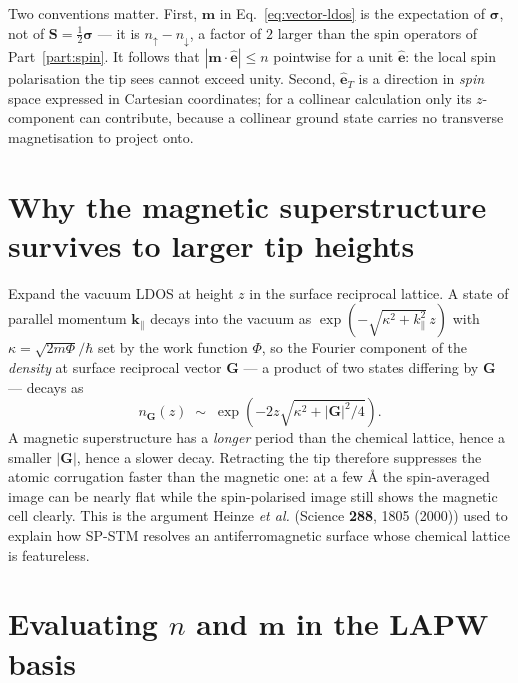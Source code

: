 \documentclass[11pt]{article}
\begin{document}
Two conventions matter. First, $\mathbf m$ in
Eq.~\eqref{eq:vector-ldos} is the expectation of $\boldsymbol\sigma$, not of
$\mathbf S=\tfrac12\boldsymbol\sigma$ --- it is $n_\uparrow-n_\downarrow$, a
factor of $2$ larger than the spin operators of Part~\ref{part:spin}. It
follows that $|\mathbf m\cdot\hat{\mathbf e}|\le n$ pointwise for a unit
$\hat{\mathbf e}$: the local spin polarisation the tip sees cannot exceed
unity. Second, $\hat{\mathbf e}_T$ is a direction in \emph{spin} space
expressed in Cartesian coordinates; for a collinear calculation only its
$z$-component can contribute, because a collinear ground state carries no
transverse magnetisation to project onto.

\section{Why the magnetic superstructure survives to larger tip heights}

Expand the vacuum LDOS at height $z$ in the surface reciprocal lattice. A
state of parallel momentum $\mathbf k_\parallel$ decays into the vacuum as
$\exp(-\sqrt{\kappa^2+k_\parallel^2}\,z)$ with $\kappa=\sqrt{2m\Phi}/\hbar$ set
by the work function $\Phi$, so the Fourier component of the \emph{density} at
surface reciprocal vector $\mathbf G$ --- a product of two states differing by
$\mathbf G$ --- decays as
\begin{equation}
  n_{\mathbf G}(z)\;\sim\;\exp\!\left(-2z\sqrt{\kappa^2+|\mathbf G|^2/4}\right).
  \label{eq:corrugation-decay}
\end{equation}
A magnetic superstructure has a \emph{longer} period than the chemical lattice,
hence a smaller $|\mathbf G|$, hence a slower decay. Retracting the tip
therefore suppresses the atomic corrugation faster than the magnetic one: at a
few {\AA} the spin-averaged image can be nearly flat while the spin-polarised
image still shows the magnetic cell clearly. This is the argument Heinze
\emph{et al.} (Science \textbf{288}, 1805 (2000)) used to explain how SP-STM
resolves an antiferromagnetic surface whose chemical lattice is featureless.

\section{Evaluating $n$ and $\mathbf m$ in the LAPW basis}
\end{document}
